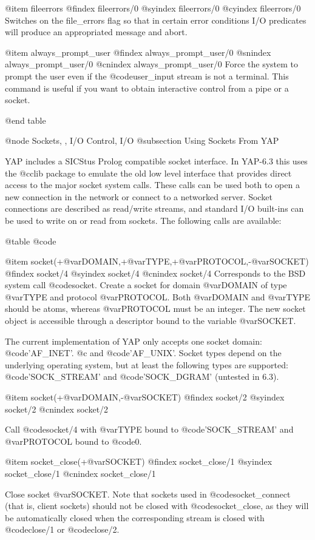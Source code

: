 {{{{{@item fileerrors
@findex fileerrors/0
@syindex fileerrors/0
@cyindex fileerrors/0
Switches on the file_errors flag so that in certain error conditions
I/O predicates will produce an appropriated message and abort.

@item always_prompt_user
@findex always_prompt_user/0
@snindex always_prompt_user/0
@cnindex always_prompt_user/0
Force the system to prompt the user even if the @code{user_input} stream
is not a terminal. This command is useful if you want to obtain
interactive control from a pipe or a socket.

@end table

@node Sockets, , I/O Control, I/O
@subsection Using Sockets From YAP

YAP includes a SICStus Prolog compatible socket interface. In YAP-6.3
this uses the @c{clib} package to emulate the old low level interface that
provides direct access to the major socket system calls. These calls
can be used both to open a new connection in the network or connect to
a networked server. Socket connections are described as read/write
streams, and standard I/O built-ins can be used to write on or read
from sockets. The following calls are available:

@table @code

@item socket(+@var{DOMAIN},+@var{TYPE},+@var{PROTOCOL},-@var{SOCKET})
@findex socket/4
@syindex socket/4
@cnindex socket/4
Corresponds to the BSD system call @code{socket}. Create a socket for
domain @var{DOMAIN} of type @var{TYPE} and protocol
@var{PROTOCOL}. Both @var{DOMAIN} and @var{TYPE} should be atoms,
whereas @var{PROTOCOL} must be an integer.
The new socket object is
accessible through a descriptor bound to the variable @var{SOCKET}.

The current implementation of YAP only accepts one socket
domain: @code{'AF_INET'}. @c and @code{'AF_UNIX'}. 
Socket types depend on the
underlying operating system, but at least the following types are
supported: @code{'SOCK_STREAM'} and @code{'SOCK_DGRAM'} (untested in 6.3).

@item socket(+@var{DOMAIN},-@var{SOCKET})
@findex socket/2
@syindex socket/2
@cnindex socket/2

Call @code{socket/4} with @var{TYPE} bound to @code{'SOCK_STREAM'} and
@var{PROTOCOL} bound to @code{0}.

@item socket_close(+@var{SOCKET})
@findex socket_close/1
@syindex socket_close/1
@cnindex socket_close/1

Close socket @var{SOCKET}. Note that sockets used in
@code{socket_connect} (that is, client sockets) should not be closed with
@code{socket_close}, as they will be automatically closed when the
corresponding stream is closed with @code{close/1} or @code{close/2}.

}}}}}

